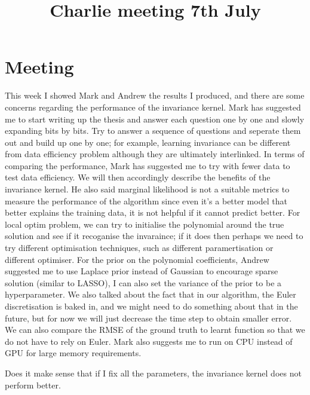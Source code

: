 \documentclass{article}
\title{\vspace{-3cm}Charlie meeting 7th July\vspace{-3em}}
\author{}
\date{}
\begin{document}
\maketitle
\section*{Meeting}
This week I showed Mark and Andrew the results I produced, and there are some concerns regarding the performance of the invariance kernel. 
Mark has suggested me to start writing up the thesis and answer each question one by one and slowly expanding bits by bits. 
Try to answer a sequence of questions and seperate them out and build up one by one; for example, learning invariance can be different from data efficiency problem although they are ultimately interlinked.  
In terms of comparing the performance, Mark has suggested me to try with fewer data to test data efficiency. 
We will then accordingly describe the benefits of the invariance kernel.
He also said marginal likelihood is not a suitable metrics to measure the performance of the algorithm since even it's a better model that better explains the training data, it is not helpful if it cannot predict better. 
For local optim problem, we can try to initialise the polynomial around the true solution and see if it recoganise the invaraince; if it does then perhaps we need to try different optimisation techniques, such as different paramertisation or different optimiser. 
For the prior on the polynomial coefficients, Andrew suggested me to use Laplace prior instead of Gaussian to encourage sparse solution (similar to LASSO), I can also set the variance of the prior to be a hyperparameter.
We also talked about the fact that in our algorithm, the Euler discretisation is baked in, and we might need to do something about that in the future, but for now we will just decrease the time step to obtain smaller error. 
We can also compare the RMSE of the ground truth to learnt function so that we do not have to rely on Euler.
Mark also suggests me to run on CPU instead of GPU for large memory requirements.

Does it make sense that if I fix all the parameters, the invariance kernel does not perform better.
\end{document}
